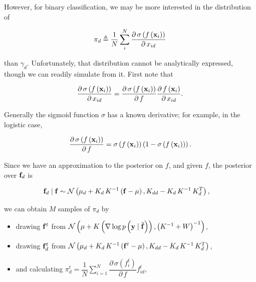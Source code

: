 \documentclass{draft}
\newcommand{\pd}{\ensuremath{\partial \,}}     %
\begin{document}
However, for binary classification, we may be more interested in the distribution of

\begin{equation}
    \pi_d \triangleq \dfrac{1}{N} \sum_i^N \dfrac{\pd \sigma \left( f \left( \mbf{x}_i \right) \right)}{\pd x_{id}}
\end{equation}

\noindent
than \( \gamma_d \).
Unfortunately, that distribution cannot be analytically expressed, though we can readily simulate from it.
First note that

\begin{equation}
    \dfrac{\pd \sigma \left( f \left( \mbf{x}_i \right) \right)}{\pd x_{id}}
    =
    \dfrac{\pd \sigma \left( f \left( \mbf{x}_i \right) \right)}{\pd f}
    \dfrac{\pd f \left( \mbf{x}_i \right)}{\pd x_{id}}.
\end{equation}

Generally the sigmoid function \( \sigma \) has a known derivative;
for example, in the logistic case,

\begin{equation}
    \dfrac{\pd \sigma \left( f \left( \mbf{x}_i \right) \right)}{\pd f}
    =
    \sigma \left( f \left( \mbf{x}_i \right) \right) \left( 1 - \sigma \left( f \left( \mbf{x}_i \right) \right) \right).
\end{equation}

\noindent
Since we have an approximation to the posterior on \( f \), and given \( f \), the posterior over \( \mathbf{f}_d \) is

\begin{align}
    \mathbf{f}_d \mid \mathbf{f}
    & \sim
    \mathcal{N} \left( \mu_d + K_d \, K^{-1} \left( \mathbf{f} - \mu \right), K_{dd} - K_{d} \, K^{-1} \, K_d^T \right),
\end{align}

we can obtain \( M \) samples of \( \pi_d \) by

\begin{itemize}
    \item drawing \( \mathbf{f}^t \) from
        \(
            \mathcal{N} \left(
                \mu + K \left( \nabla \log p \left( \mathbf{y} \mid \hat{\mathbf{f}} \right) \right), \left( K^{-1} + W \right)^{-1}
            \right)
        \),
    \item drawing \( \mathbf{f}^t_d \) from
        \(
            \mathcal{N} \left(
                \mu_d + K_d \, K^{-1} \left( \mathbf{f}^t - \mu \right), K_{dd} - K_{d} \, K^{-1} \, K_d^T
            \right)
        \),
    \item and calculating \( \pi_d^t = \dfrac{1}{N} \displaystyle\sum_{i=1}^N \dfrac{\pd \sigma \left( f_i^t \right)}{\pd f} f_{id}^t \),
\end{itemize}
\end{document}
